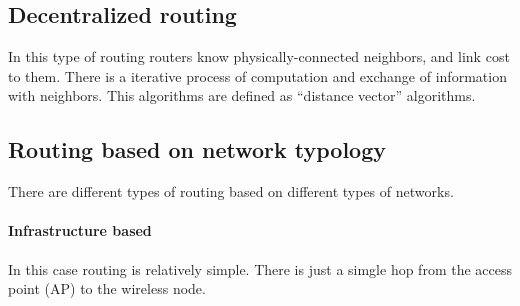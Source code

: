 \subsection{Decentralized routing}
In this type of routing routers know physically-connected neighbors, and link
cost to them. There is a iterative process of computation and exchange of
information with neighbors.
This algorithms are defined as ``distance vector'' algorithms.

\subsection{Routing based on network typology}

There are different types of routing based on different types of networks.

\paragraph*{Infrastructure based} In this case routing is relatively simple.
There is just a simgle hop from the access point (AP) to the wireless node.

